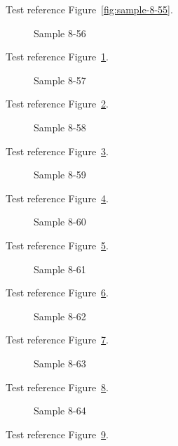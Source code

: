 Test reference Figure~\ref{fig:sample-8-55}.

\begin{figure}[tbhp]
\caption{Sample 8-56}
\label{fig:sample-8-56}
\end{figure}

Test reference Figure~\ref{fig:sample-8-56}.

\begin{figure}[tbhp]
\caption{Sample 8-57}
\label{fig:sample-8-57}
\end{figure}

Test reference Figure~\ref{fig:sample-8-57}.

\begin{figure}[tbhp]
\caption{Sample 8-58}
\label{fig:sample-8-58}
\end{figure}

Test reference Figure~\ref{fig:sample-8-58}.

\begin{figure}[tbhp]
\caption{Sample 8-59}
\label{fig:sample-8-59}
\end{figure}

Test reference Figure~\ref{fig:sample-8-59}.

\begin{figure}[tbhp]
\caption{Sample 8-60}
\label{fig:sample-8-60}
\end{figure}

Test reference Figure~\ref{fig:sample-8-60}.

\begin{figure}[tbhp]
\caption{Sample 8-61}
\label{fig:sample-8-61}
\end{figure}

Test reference Figure~\ref{fig:sample-8-61}.

\begin{figure}[tbhp]
\caption{Sample 8-62}
\label{fig:sample-8-62}
\end{figure}

Test reference Figure~\ref{fig:sample-8-62}.

\begin{figure}[tbhp]
\caption{Sample 8-63}
\label{fig:sample-8-63}
\end{figure}

Test reference Figure~\ref{fig:sample-8-63}.

\begin{figure}[tbhp]
\caption{Sample 8-64}
\label{fig:sample-8-64}
\end{figure}

Test reference Figure~\ref{fig:sample-8-64}.

